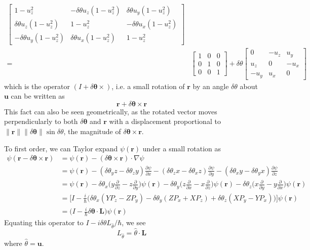 \documentclass[../principles-of-quantum-mechanics.tex]{subfiles}
\begin{document}
\begin{questions}
\begin{solution}
\begin{align*}
\begin{bmatrix}
			1 - u_z^2 & -\delta\theta u_z(1 - u_z^2) & \delta\theta u_y(1 - u_z^2) \\
			\delta\theta u_z(1 - u_z^2) & 1 - u_z^2 & -\delta\theta u_x(1 - u_z^2) \\
			-\delta\theta u_y(1 - u_z^2) & \delta\theta u_x (1 - u_z^2) & 1 - u_z^2
		\end{bmatrix} \\
		=\,&\begin{bmatrix}
			1 & 0 & 0 \\
			0 & 1 & 0 \\
			0 & 0 & 1
		\end{bmatrix} + \delta\theta\begin{bmatrix}
			0 & -u_z & u_y \\
			u_z & 0 & -u_x \\
			-u_y & u_x & 0
		\end{bmatrix}
		\end{align*}
		which is the operator $(I + \delta\boldsymbol{\theta}\times)$, i.e. a small rotation of $\mathbf{r}$ by an angle $\delta\theta$ about $\mathbf{u}$ can be written as
		$$\mathbf{r} + \delta\boldsymbol{\theta}\times\mathbf{r}$$
		This fact can also be seen geometrically, as the rotated vector moves perpendicularly to both $\delta\boldsymbol{\theta}$ and $\mathbf{r}$ with a displacement proportional to $\|\mathbf{r}\| \|\delta\boldsymbol{\theta}\|\sin\delta\theta$, the magnitude of $\delta\boldsymbol{\theta}\times\mathbf{r}$.
		
		To first order, we can Taylor expand $\psi(\mathbf{r})$ under a small rotation as
		\begin{align*}
			\psi(\mathbf{r} - \delta\boldsymbol{\theta}\times\mathbf{r}) &= \psi(\mathbf{r}) - (\delta\boldsymbol{\theta}\times\mathbf{r})\cdot\nabla\psi \\
			&= \psi(\mathbf{r}) - (\delta\theta_y z - \delta\theta_z y)\frac{\partial\psi}{\partial x} - (\delta\theta_zx - \delta\theta_xz)\frac{\partial\psi}{\partial y} - (\delta\theta_xy - \delta\theta_yx)\frac{\partial\psi}{\partial z} \\
			&= \psi(\mathbf{r}) - \delta\theta_x\Big(y\frac{\partial}{\partial z} - z\frac{\partial}{\partial y}\Big)\psi(\mathbf{r}) - \delta\theta_y\Big(z\frac{\partial}{\partial x} - x\frac{\partial}{\partial z}\Big)\psi(\mathbf{r}) - \delta\theta_z\Big(x\frac{\partial}{\partial y} - y\frac{\partial}{\partial x}\Big)\psi(\mathbf{r}) \\
			&= \Big[I - \frac{i}{\hbar}\Big(\delta\theta_x(YP_z - ZP_y) - \delta\theta_y(ZP_x + XP_z) + \delta\theta_z(XP_y - YP_x)\Big)\Big]\psi(\mathbf{r}) \\
			&= \Big(I - \frac{i}{\hbar}\delta\boldsymbol{\theta}\cdot\mathbf{L}\Big)\psi(\mathbf{r})
		\end{align*}
		Equating this operator to $I - i\delta\theta L_{\hat{\theta}}/\hbar$, we see
		$$L_{\hat{\theta}} = \hat{\theta}\cdot\mathbf{L}$$
		where $\hat{\theta} = \mathbf{u}$.
	\end{solution}
	

\end{questions}
\end{document}

